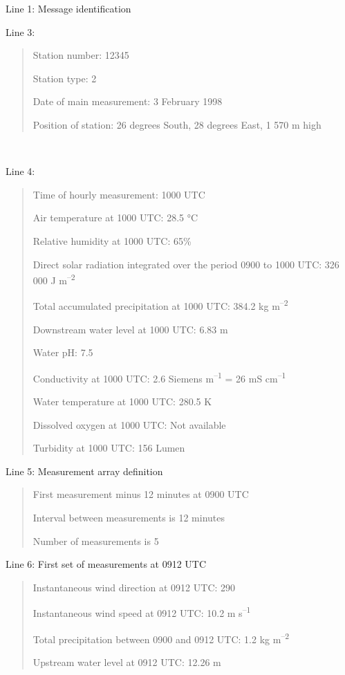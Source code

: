 Line 1: Message identification

Line 3:

\begin{quote}
Station number: 12345

Station type: 2

Date of main measurement: 3 February 1998

Position of station: 26 degrees South, 28 degrees East, 1 570 m high
\end{quote}

\emph{\textbf{\\
}}

Line 4:

\begin{quote}
Time of hourly measurement: 1000 UTC

Air temperature at 1000 UTC: 28.5 °C

Relative humidity at 1000 UTC: 65\%

Direct solar radiation integrated over the period 0900 to 1000 UTC: 326 000 J m\textsuperscript{--2}

Total accumulated precipitation at 1000 UTC: 384.2 kg m\textsuperscript{--2}

Downstream water level at 1000 UTC: 6.83 m

Water pH: 7.5

Conductivity at 1000 UTC: 2.6 Siemens m\textsuperscript{--1} = 26 mS cm\textsuperscript{--1}

Water temperature at 1000 UTC: 280.5 K

Dissolved oxygen at 1000 UTC: Not available

Turbidity at 1000 UTC: 156 Lumen
\end{quote}

Line 5: Measurement array definition

\begin{quote}
First measurement minus 12 minutes at 0900 UTC

Interval between measurements is 12 minutes

Number of measurements is 5
\end{quote}

Line 6: First set of measurements at 0912 UTC

\begin{quote}
Instantaneous wind direction at 0912 UTC: 290

Instantaneous wind speed at 0912 UTC: 10.2 m s\textsuperscript{--1}

Total precipitation between 0900 and 0912 UTC: 1.2 kg m\textsuperscript{--2}

Upstream water level at 0912 UTC: 12.26 m
\end{quote}

